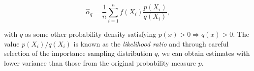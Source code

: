 \begin{equation*}
    \hat{\alpha}_q = \frac{1}{n} \sum_{i=1}^n f(X_i) \frac{p(X_i)}{q(X_i)},
\end{equation*}

with $q$ as some other probability density satisfying $p(x) > 0 \Rightarrow q(x) > 0$. The value $p(X_i)/q(X_i)$ is known as the \textit{likelihood ratio} and through careful selection of the importance sampling distribution $q$, we can obtain estimates with lower variance than those from the original probability measure $p$.







